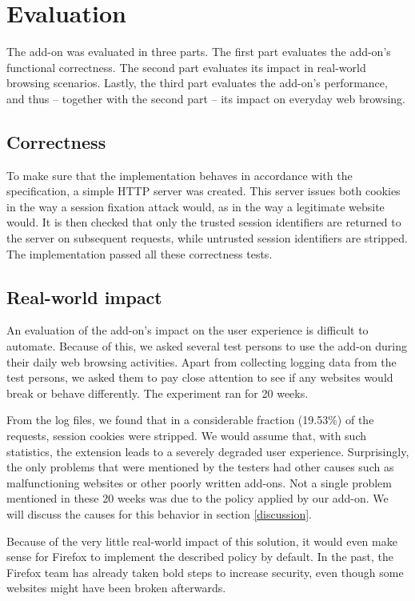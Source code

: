 \section{Evaluation}\label{evaluation}

The add-on was evaluated in three parts. The first part evaluates the add-on's functional correctness. The second part evaluates its impact in real-world browsing scenarios. Lastly, the third part evaluates the add-on's performance, and thus -- together with the second part -- its impact on everyday web browsing.

\subsection{Correctness}

To make sure that the implementation behaves in accordance with the specification, a simple HTTP server was created. This server issues both cookies in the way a session fixation attack would, as in the way a legitimate website would. It is then checked that only the trusted session identifiers are returned to the server on subsequent requests, while untrusted session identifiers are stripped. The implementation passed all these correctness tests.

\subsection{Real-world impact}

An evaluation of the add-on's impact on the user experience is difficult to automate. Because of this, we asked several test persons to use the add-on during their daily web browsing activities. Apart from collecting logging data from the test persons, we asked them to pay close attention to see if any websites would break or behave differently. The experiment ran for 20 weeks.

From the log files, we found that in a considerable fraction (19.53\%) of the requests, session cookies were stripped. We would assume that, with such statistics, the extension leads to a severely degraded user experience. Surprisingly, the only problems that were mentioned by the testers had other causes such as malfunctioning websites or other poorly written add-ons. Not a single problem mentioned in these 20 weeks was due to the policy applied by our add-on. We will discuss the causes for this behavior in section \ref{discussion}.

Because of the very little real-world impact of this solution, it would even make sense for Firefox to implement the described policy by default. In the past, the Firefox team has already taken bold steps to increase security, even though some websites might have been broken afterwards. \cite{Singh2010,MozillaXmlHttp}


